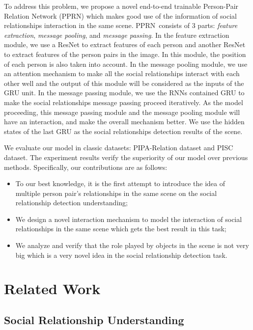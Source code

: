 \documentclass{article}
\newcommand{\PPRN}{{\sf PPRN}}
\begin{document}
To address this problem, we propose a novel end-to-end trainable Person-Pair Relation Network (\PPRN) which makes good use of the information of social relationships interaction in the same scene. \PPRN \ consists of 3 parts:  \emph{feature extraction}, \emph{message pooling}, and \emph{message passing}. In the feature extraction module, we use a ResNet \cite{DBLP:conf/cvpr/HeZRS16} to extract features of each person and another ResNet to extract features of the person pairs in the image. In this module, the position of each person is also taken into account. In the message pooling module, we use an attention mechanism to make all the social relationships interact with each other well and the output of this module will be considered as the inputs of the GRU unit. In the message passing module,  we use the RNNs contained GRU to make the social relationships message passing proceed iteratively. As the model proceeding, this message passing module and the message pooling module will have an interaction, and make the overall mechanism better. We use the hidden states of the last GRU as the social relationships detection results of the scene.

We evaluate our model in classic datasets: PIPA-Relation dataset and PISC dataset. The experiment results verify the superiority of our model over previous methods. Specifically, our contributions are as follows:
\begin{itemize}
	\item To our best knowledge, it is the first attempt to introduce the idea of multiple person pair's relationships in the same scene on the social relationship detection understanding;
	\item We design a novel interaction mechanism to model the interaction of social relationships in the same scene which gets the best result in this task;
	\item We analyze and verify that the role played by objects in the scene is not very big which is a very novel idea in the social relationship detection task.
\end{itemize}


\section{Related Work}

\subsection{Social Relationship Understanding}
\end{document}
